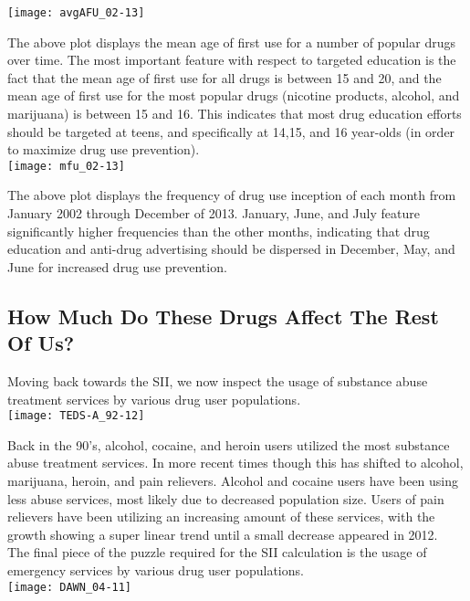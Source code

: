 \documentclass[a4 paper]{article}
\begin{document}
\noindent\texttt{[image: avgAFU\_02-13]}

\noindent The above plot displays the mean age of first use for a number of popular drugs over time. The most important feature with respect to targeted education is the fact that the mean age of first use for all drugs is between 15 and 20, and the mean age of first use for the most popular drugs (nicotine products, alcohol, and marijuana) is between 15 and 16. This indicates that most drug education efforts should be targeted at teens, and specifically at 14,15, and 16 year-olds (in order to maximize drug use prevention).\\

\noindent\texttt{[image: mfu\_02-13]}

\noindent The above plot displays the frequency of drug use inception of each month from January 2002 through December of 2013. January, June, and July feature significantly higher frequencies than the other months, indicating that drug education and anti-drug advertising should be dispersed in December, May, and June for increased drug use prevention.

\subsection*{How Much Do These Drugs Affect The Rest Of Us?}
Moving back towards the SII, we now inspect the usage of substance abuse treatment services by various drug user populations.\\

\noindent\texttt{[image: TEDS-A\_92-12]}

\noindent Back in the 90's, alcohol, cocaine, and heroin users utilized the most substance abuse treatment services. In more recent times though this has shifted to alcohol, marijuana, heroin, and pain relievers. Alcohol and cocaine users have been using less abuse services, most likely due to decreased population size. Users of pain relievers have been utilizing an increasing amount of these services, with the growth showing a super linear trend until a small decrease appeared in 2012.\\

\noindent The final piece of the puzzle required for the SII calculation is the usage of emergency services by various drug user populations.\\

\noindent\texttt{[image: DAWN\_04-11]}
\end{document}
